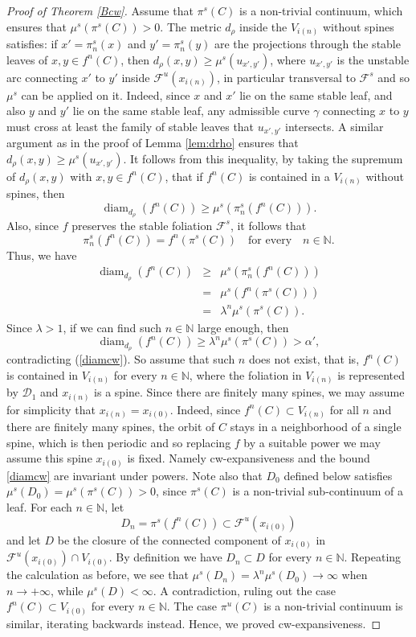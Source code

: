 \documentclass{amsart}
\theoremstyle{plain}
\theoremstyle{definition}
\newcommand{\mc}{\mathcal}
\newcommand{\N}{\mathbb{N}}
\newcommand{\diam}{\operatorname{diam}}
\begin{document}
\begin{proof}[Proof of Theorem \ref{Bcw}]
Assume that $\pi^s(C)$ is a non-trivial continuum, which ensures that $\mu^s(\pi^s(C))>0$. The metric $d_{\rho}$ inside the  $V_{i(n)}$ without spines satisfies: if $x'=\pi^s_n(x)$ and $y'=\pi^s_n(y)$ are the projections through the stable leaves of $x,y\in f^n(C)$, then $d_{\rho}(x,y)\geq\mu^s(u_{x',y'})$, where $u_{x',y'}$ is the unstable arc connecting $x'$ to $y'$ inside $\mc{F}^u(x_{i(n)})$, in particular transversal to $\mc{F}^s$ and so $\mu^s$ can be applied on it. Indeed, since $x$ and $x'$ lie on the same stable leaf, and also $y$ and $y'$ lie on the same stable leaf, any admissible curve $\gamma$ connecting $x$ to $y$ must cross at least the family of stable leaves that $u_{x',y'}$ intersects. A similar argument as in the proof of Lemma \ref{lem:drho} ensures that $d_{\rho}(x,y)\geq\mu^s(u_{x',y'})$. It follows from this inequality, by taking the supremum of $d_{\rho}(x,y)$ with $x,y\in f^n(C)$, that if $f^n(C)$ is contained in a  $V_{i(n)}$ without spines, then $$\diam_{d_\rho}(f^n(C))
\geq \mu^s(\pi^s_n(f^n(C))).$$
Also, since $f$ preserves the stable foliation $\mc{F}^s$, it follows that
$$\pi^s_n(f^n(C))=f^n(\pi^s(C)) \,\,\,\,\,\, \text{for every} \,\,\,\,\,\, n\in\N.$$ Thus, we have
\begin{eqnarray*}
\diam_{d_\rho}(f^n(C))
&\geq& \mu^s(\pi^s_n(f^n(C)))\\
&=&\mu^s(f^n(\pi^s(C)))\\
&=&\lambda^n\mu^s(\pi^s(C)).
\end{eqnarray*}
Since $\lambda>1$,  
if we can find such
$n\in\N$ large enough, then
$$\diam_{d_\rho}(f^n(C))\geq\lambda^n\mu^s(\pi^s(C))>\alpha',$$
contradicting (\ref{diamcw}). 
So assume that such $n$ does not exist, that is, $f^n(C)$ is contained in  $V_{i(n)}$ for every $n\in\N$, where the foliation in  $V_{i(n)}$ is represented by $\mc{D}_1$ and $x_{i(n)}$ is a spine. Since there are finitely many spines, we may assume for simplicity that $x_{i(n)}=x_{i(0)}$. 
Indeed, since $f^n(C)\subset V_{i(n)}$ for all $n$ and there are finitely many spines, the
orbit of $C$ stays in a neighborhood of a single spine, which is then periodic and so replacing $f$
by a suitable power we may assume this spine $x_{i(0)}$ is fixed. 
Namely cw-expansiveness and the bound \eqref{diamcw} are invariant under
powers.
Note also that $D_0$ defined below satisfies $\mu^s(D_0)=\mu^s(\pi^s(C))>0$,
since $\pi^s(C)$ is a non-trivial sub-continuum of a leaf.
For each $n\in\N$, let $$D_n=\pi^s(f^n(C))\subset \mc{F}^u(x_{i(0)})$$
and let $D$ be the closure of the connected component of $x_{i(0)}$ in $\mc{F}^u(x_{i(0)})\cap  V_{i(0)}$. By definition we have $D_n\subset D$ for every $n\in\N$.
Repeating the calculation as before, we see that $\mu^s(D_n)=\lambda^n\mu^s(D_0)\to \infty$ when $n\to+\infty$, while $\mu^s(D)<\infty$. A contradiction, ruling out the case
$f^n(C)\subset  V_{i(0)}$ for every $n\in\N$. The case $\pi^u(C)$ is a non-trivial continuum is similar, iterating backwards instead. Hence, we proved cw-expansiveness.


\end{proof}
\end{document}
